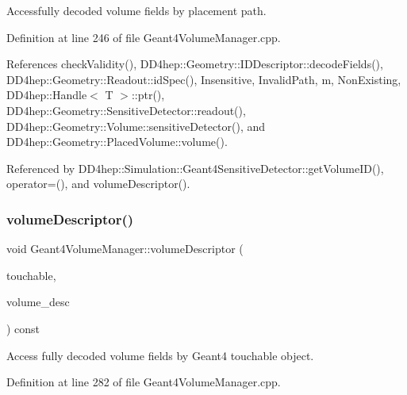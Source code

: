 Accessfully decoded volume fields by placement path. 



Definition at line 246 of file Geant4\+Volume\+Manager.\+cpp.



References check\+Validity(), D\+D4hep\+::\+Geometry\+::\+I\+D\+Descriptor\+::decode\+Fields(), D\+D4hep\+::\+Geometry\+::\+Readout\+::id\+Spec(), Insensitive, Invalid\+Path, m, Non\+Existing, D\+D4hep\+::\+Handle$<$ T $>$\+::ptr(), D\+D4hep\+::\+Geometry\+::\+Sensitive\+Detector\+::readout(), D\+D4hep\+::\+Geometry\+::\+Volume\+::sensitive\+Detector(), and D\+D4hep\+::\+Geometry\+::\+Placed\+Volume\+::volume().



Referenced by D\+D4hep\+::\+Simulation\+::\+Geant4\+Sensitive\+Detector\+::get\+Volume\+I\+D(), operator=(), and volume\+Descriptor().

\hypertarget{class_d_d4hep_1_1_simulation_1_1_geant4_volume_manager_ab88934cb43f8caffd4549d814aa91450}{}\label{class_d_d4hep_1_1_simulation_1_1_geant4_volume_manager_ab88934cb43f8caffd4549d814aa91450} 
\subsubsection{\texorpdfstring{volume\+Descriptor()}{volumeDescriptor()}\hspace{0.1cm}{\footnotesize\ttfamily [2/2]}}
{\footnotesize\ttfamily void Geant4\+Volume\+Manager\+::volume\+Descriptor (\begin{DoxyParamCaption}\item[{const G4\+V\+Touchable $\ast$}]{touchable,  }\item[{\hyperlink{class_d_d4hep_1_1_simulation_1_1_geant4_volume_manager_aeedd11a516f671331ec2a46f5d39768d}{Vol\+I\+D\+Descriptor} \&}]{volume\+\_\+desc }\end{DoxyParamCaption}) const}



Access fully decoded volume fields by Geant4 touchable object. 



Definition at line 282 of file Geant4\+Volume\+Manager.\+cpp.



